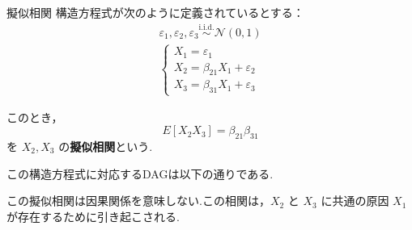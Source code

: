\documentclass[uplatex, dvipdfmx]{jsarticle}
\begin{document}
\begin{exm}[label={exm:PseudoCorr}]{擬似相関}
  構造方程式が次のように定義されているとする：
  \begin{align}
    \varepsilon_1, \varepsilon_2, \varepsilon_3 \overset{\text{i.i.d.}}{\sim} \mathcal{N}(0, 1) \\
    \begin{cases}
    X_1 = \varepsilon_1 \\
    X_2 = \beta_{21} X_1 + \varepsilon_2 \\
    X_3 = \beta_{31} X_1 + \varepsilon_3
    \end{cases}
  \end{align}

  このとき，
  \begin{equation}
  E[X_2 X_3] = \beta_{21} \beta_{31}
  \end{equation}
  を $X_2, X_3$ の\textbf{擬似相関}という.

  この構造方程式に対応するDAGは以下の通りである.
  \begin{center}
  \end{center}
  この擬似相関は因果関係を意味しない.この相関は，$X_2$ と $X_3$ に共通の原因 $X_1$ が存在するために引き起こされる.
\end{exm}
\end{document}
